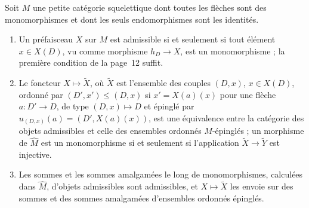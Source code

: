 \begin{encadre}
\begin{theoreme}
Soit $M$ une petite catégorie squelettique dont toutes les flèches sont des monomorphismes et dont les seuls endomorphismes sont les identités.
\begin{enumerate}
\item Un préfaisceau $X$ sur $M$ est admissible si et seulement si tout élément $x \in X(D)$, vu comme morphisme $h_D \to X$, est un monomorphisme ; la première condition de la page~12 suffit.
\item Le foncteur $X \mapsto \widetilde X$, où $\widetilde X$ est l'ensemble des couples $(D, x)$, $x \in X(D)$, ordonné par $(D', x') \leq (D, x)$ si $x' = X(a)(x)$ pour une flèche $a : D' \to D$, de type $(D, x) \mapsto D$ et épinglé par $u_{(D,x)}(a) = (D', X(a)(x))$, est une équivalence entre la catégorie des objets admissibles et celle des ensembles ordonnés $M$-épinglés ; un morphisme de $\widehat M$ est un monomorphisme si et seulement si l'application $\widetilde X \to \widetilde Y$ est injective.
\item Les sommes et les sommes amalgamées le long de monomorphismes, calculées dans $\widehat M$, d'objets admissibles sont admissibles, et $X \mapsto \widetilde X$ les envoie sur des sommes et des sommes amalgamées d'ensembles ordonnés épinglés.
\end{enumerate}
\end{theoreme}
\end{encadre}

